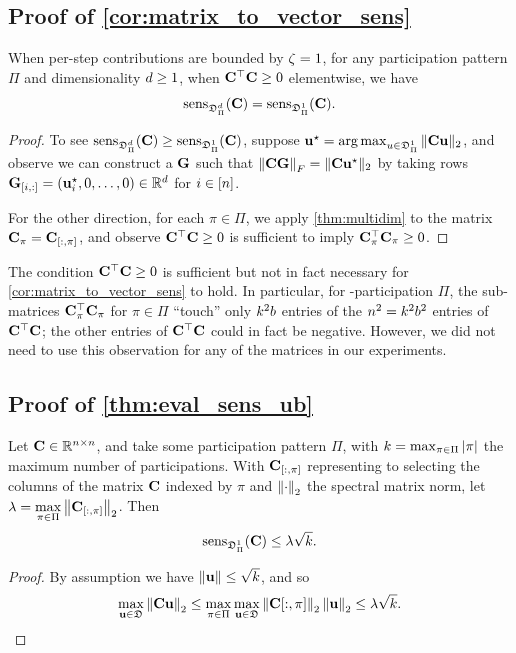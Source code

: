 \subsection{Proof of \cref{cor:matrix_to_vector_sens}}
\begin{namedcorollary}
When per-step contributions are bounded by $\zeta=1$, for any participation pattern $\Pi$ and dimensionality $d \ge 1$, when $\mathbf{C}^\top\mathbf{C} \ge 0$ elementwise, we have
\[
\operatorname{sens}_{\mathfrak{D}^d_\Pi}(\mathbf{C}) = \operatorname{sens}_{\mathfrak{D}^1_\Pi}(\mathbf{C}).
\]
\end{namedcorollary}
\begin{proof}
To see $\operatorname{sens}_{\mathfrak{D}^d_\Pi}(\mathbf{C}) \ge \operatorname{sens}_{\mathfrak{D}^1_\Pi}(\mathbf{C})$, suppose $\mathbf{u}^\star = \operatorname*{arg\,max}_{u \in \mathfrak{D}^1_\Pi} \| \mathbf{C} \mathbf{u} \|_2$, and observe we can construct a $\mathbf{G}$ such that $\left\|\mathbf{C} \mathbf{G}\right\|_F = \| \mathbf{C} \mathbf{u}^\star \|_2$ by taking rows $\mathbf{G}_{[i, :]} = (\mathbf{u}^\star_i, 0, \dots, 0) \in \mathbb{R}^d$ for $i \in [n]$.

For the other direction, for each $\pi \in \Pi$, we apply \cref{thm:multidim} to the matrix $\mathbf{C}_\pi = \mathbf{C}_{[:, \pi]}$, and observe $\mathbf{C}^\top\mathbf{C} \ge 0$ is sufficient to imply $\mathbf{C}^\top_\pi \mathbf{C}_\pi \ge 0$.
\end{proof}

 The condition $\mathbf{C}^\top\mathbf{C} \ge 0$ is sufficient but not in fact necessary for \cref{cor:matrix_to_vector_sens} to hold. In particular, for \multiepoch-participation $\Pi$, the sub-matrices $\mathbf{C}^\top_\pi \mathbf{C}_\pi$ for $\pi \in \Pi$ ``touch'' only $k^2 b$ entries of the $n^2 = k^2 b^2$ entries of $\mathbf{C}^\top \mathbf{C}$; the other entries of $\mathbf{C}^\top \mathbf{C}$ could in fact be negative. However, we did not need to use this observation for any of the matrices in our experiments.



\subsection{Proof of \cref{thm:eval_sens_ub}}\label{app:ssec:eval_sens_ub_proof}

\begin{namedtheorem}
Let $\mathbf{C} \in \mathbb{R}^{n \times n}$, and take some participation pattern $\Pi$, with $k = \max_{\pi \in \Pi} |\pi|$ the maximum number of participations. 
With $\mathbf{C}_{[:, \pi]}$ representing to selecting the columns of the matrix $\mathbf{C}$ indexed by $\pi$ and $\left\|\cdot\right\|_2$ the spectral matrix norm, let
$
\lambda=\max\limits_{\pi \in \Pi}\left\|\mathbf{C}_{[:, \pi]}\right\|_2
$. Then 
\[
 \operatorname{sens}_{\mathfrak{D}^1_\Pi}(\mathbf{C}) \le \lambda\sqrt{k}.
\]
\end{namedtheorem}

\begin{proof}
By assumption we have $\| \mathbf{u} \| \le \sqrt{k}$, and so
\begin{equation*}
    \max_{\mathbf{u} \in \mathfrak{D}} \left\|\mathbf{C}\mathbf{u}\right\|_2
    \leq \max_{\pi \in \Pi}\max_{\mathbf{u} \in \mathfrak{D}} \left\|\mathbf{C}[:,\pi]\right\|_2\left\|\mathbf{u}\right\|_2
    \leq \lambda\sqrt{k}.
\end{equation*}
\end{proof}

